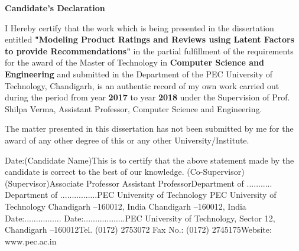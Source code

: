 \documentclass{article}
\begin{document}
\justify
\begin{center}
\textbf{Candidate's Declaration}
\end{center}
I Hereby  certify  that  the  work  which  is  being  presented  in  the dissertation entitled \textbf{"Modeling Product Ratings and Reviews using Latent Factors to provide Recommendations"} in  the partial fulfillment of the requirements for the award of the Master of Technology in \textbf{Computer Science and Engineering} and submitted in the Department of the PEC University of Technology, Chandigarh, is  an  authentic record of my own work carried out during the period from year \textbf{2017} to year \textbf{2018} under the Supervision of Prof. Shilpa Verma, Assistant Professor, Computer Science and Engineering. \par
The  matter  presented  in  this dissertation has  not  been  submitted  by  me  for  the  award  of  any other degree of this or any other University/Institute. \par

Date:(Candidate Name)This  is  to  certify  that  the  above  statement  made  by  the  candidate  is  correct  to  the  best  of  our knowledge. (Co-Supervisor)(Supervisor)Associate Professor                                                         Assistant ProfessorDepartment of ...........                   Department of ................PEC University of Technology                                        PEC University of Technology                                                        Chandigarh –160012, India                                            Chandigarh –160012, India                                                                                                   Date:................                                                           Date:..................PEC University of Technology, Sector 12, Chandigarh –160012Tel. (0172) 2753072 Fax No.: (0172) 2745175Website: www.pec.ac.in
\end{document}
